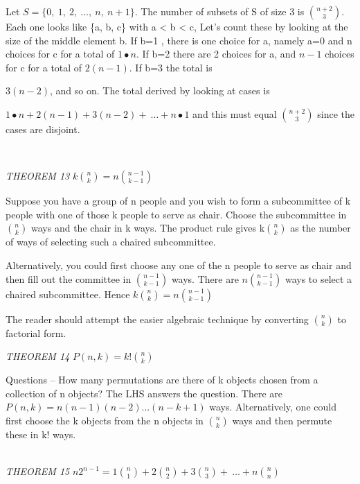 \documentclass[10pt,letter]{article}
\begin{document}
Let \(S = \{ 0,\ 1,\ 2,\ \ldots,\ n,\ n + 1\}\). The number of subsets
of S of size 3 is \(\binom{n + 2}{3}
\). Each one looks like \{a, b, c\} with a \textless{} b
\textless{} c, Let's count these by looking at the size of the middle
element b. If b=1 , there is one choice for a, namely a=0 and n choices
for c for a total of \(1 \bullet n\). If b=2 there are 2 choices for a,
and \(n - 1\) choices for c for a total of \(2(n - 1)\). If b=3 the
total is

\(3(n - 2)\), and so on. The total derived by looking at cases is

\(1 \bullet n + 2\left( n - 1 \right) + 3\left( n - 2 \right) + \ \ldots + n \bullet 1\)
and this must equal \(\binom{n + 2}{3}
\) since the cases are disjoint.

\emph{\\
}

\emph{THEOREM 13} \(k
\binom{n}{k}
 = n
\binom{n - 1}{k - 1}
\)

Suppose you have a group of n people and you wish to form a subcommittee
of k people with one of those k people to serve as chair. Choose the
subcommittee in \(\binom{n}{k}
\) ways and the chair in k ways. The product rule
gives\(\text{\ k}
\binom{n}{k}
\) as the number of ways of selecting such a chaired
subcommittee.

Alternatively, you could first choose any one of the n people to serve
as chair and then fill out the committee in \(\binom{n - 1}{k - 1}
\) ways. There are \(n
\binom{n - 1}{k - 1}
\) ways to select a chaired subcommittee. Hence
\(k
\binom{n}{k}
 = n
\binom{n - 1}{k - 1}
\)

The reader should attempt the easier algebraic technique by converting
\(\binom{n}{k}
\) to factorial form.

\emph{THEOREM 14} \(P\left( n,k \right) = k!
\binom{n}{k}
\)

Questions -- How many permutations are there of k objects chosen from a
collection of n objects? The LHS answers the question. There are
\(P\left( n,k \right) = n\left( n - 1 \right)\left( n - 2 \right)...(n - k + 1)\)
ways. Alternatively, one could first choose the k objects from the n
objects in \(\binom{n}{k}
\) ways and then permute these in k! ways.

\emph{\\
THEOREM 15} \(n2^{n - 1} = 1
\binom{n}{1}
 + 2
\binom{n}{2}
 + 3
\binom{n}{3}
 + \ \ldots + n
\binom{n}{n}
\)
\end{document}
